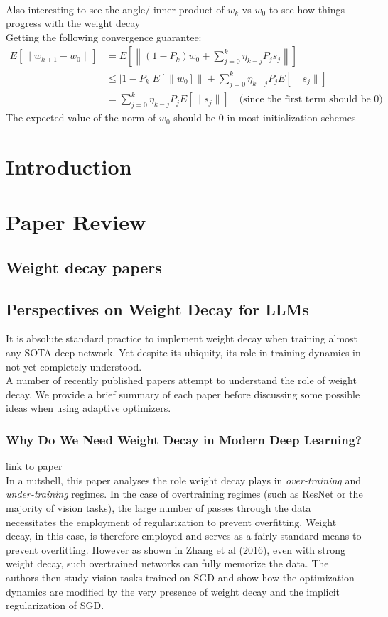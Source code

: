 \documentclass[12pt]{book}
\begin{document}
\\
Also interesting to see the angle/ inner product of $w_k$ vs  $w_0$ to see how things progress with the weight decay \\
Getting the following convergence guarantee:
\begin{align*}
	E\left[ \|w_{k+1} - w_0 \|\right] &= E\left[ \left\|(1 - P_k)w_0 + \sum_{j=0}^{k} {\eta_{k-j}P_js_j} \right\| \right] \\
					  &\le |1 - P_k|E[\|w_0]\| + \sum_{j=0}^{k} {\eta_{k-j}P_j E[\|s_j\|]}  \\
					  &= \sum_{j=0}^{k} {\eta_{k-j}P_j E[\|s_j\|]}  \quad (\text{since the first term should be 0) }
\end{align*}
The expected value of the norm of $w_0$ should be 0 in most initialization schemes

\chapter{Introduction}
\chapter{Paper Review}



\section{Weight decay papers}

\section*{Perspectives on Weight Decay for LLMs}
It is absolute standard practice to implement weight decay when training almost any SOTA deep network. Yet despite its ubiquity, its role in training dynamics in not yet completely understood. \\
A number of recently published papers attempt to understand the role of weight decay. We provide a brief summary of each paper before discussing some possible ideas when using adaptive optimizers. 
\\
\subsection*{Why Do We Need Weight Decay
in Modern Deep Learning?}
\href{https://arxiv.org/pdf/2310.04415}{link to paper}\\
In a nutshell, this paper analyses the role weight decay plays in \emph{over-training} and \emph{under-training} regimes. In the case of overtraining regimes (such as ResNet or the majority of vision tasks), the large number of passes through the data necessitates the employment of regularization to prevent overfitting. Weight decay, in this case, is therefore employed and serves as a fairly standard means to prevent overfitting. However as shown in Zhang et al (2016), even with strong weight decay, such overtrained networks can fully memorize the data. The authors then study vision tasks trained on SGD and show how the optimization dynamics are modified by the very presence of weight decay and the implicit regularization of SGD. 
\end{document}

